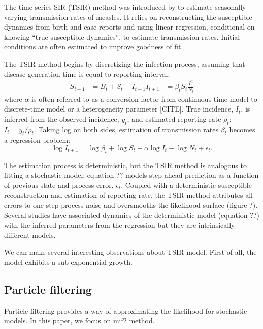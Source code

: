 \documentclass{article}
\begin{document}
The time-series SIR (TSIR) method was introduced by \cite{bjornstad2002dynamics} to estimate seasonally varying transmission rates of measles.
It relies on reconstructing the susceptible dynamics from birth and case reports and using linear regression, conditional on knowing ``true susceptible dynamics'', to estimate transmission rates.
Initial conditions are often estimated to improve goodness of fit.

The TSIR method begins by discretizing the infection process, assuming that disease generation-time is equal to reporting interval:
\begin{equation}
\begin{aligned}
S_{t+1} &= B_t + S_t - I_{t+1}
I_{t+1} &= \beta_t S_t \frac{I_t^\alpha}{N_t}
\end{aligned}
\end{equation}
where $\alpha$ is often referred to as a conversion factor from continuous-time model to discrete-time model or a heterogeneity parameter [CITE].
True incidence, $I_t$, is inferred from the observed incidence, $y_t$, and estimated reporting rate $\rho_t$: $I_t = y_t/\rho_t$.
Taking log on both sides, estimation of transmission rates $\beta_t$ becomes a regression problem:
\begin{equation}
\log I_{t + 1} = \log \beta_t + \log S_t + \alpha \log I_t - \log N_t + \epsilon_t.
\end{equation}

The estimation process is deterministic, but the TSIR method is analogous to fitting a stochastic model: 
equation ?? models step-ahead prediction as a function of previous state and process error, $\epsilon_t$. 
Coupled with a deterministic susceptible reconstruction and estimation of reporting rate, the TSIR method attributes all errors to one-step process noise and oversmooths the likelihood surface (figure ?).
Several studies have associated dynamics of the deterministic model (equation ??) with the inferred parameters from the regression but they are intrinsically different models.

We can make several interesting observations about TSIR model.
First of all, the model exhibits a sub-exponential growth.



\subsection{Particle filtering}

Particle filtering provides a way of approximating the likelihood for stochastic models.
In this paper, we focus on mif2 method.
\end{document}
